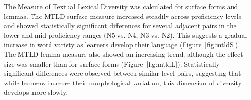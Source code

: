 
The Measure of Textual Lexical Diversity was calculated for surface forms and lemmas. The
MTLD-surface measure increased steadily across proficiency levels and showed statistically significant differences
for several adjacent pairs in the lower and mid-proficiency ranges (N5 vs. N4, N3 vs. N2). This suggests a gradual
increase in word variety as learners develop their language (Figure~\ref{fig:mtldS}). The MTLD-lemma measure also
showed an increasing trend, although the effect size was smaller than for surface forms (Figure~\ref{fig:mtldL}). Statistically
significant
differences were observed between similar level pairs, suggesting that while learners increase their morphological
variation, this dimension of diversity develops more slowly.


